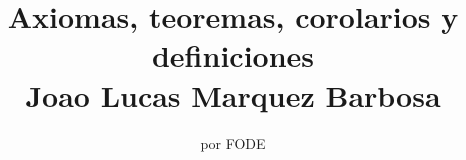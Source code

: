 \normalfont

\author{\Large  por FODE}
\title{Axiomas, teoremas, corolarios y definiciones\\ \small Joao Lucas Marquez Barbosa}
\date{}
\pagestyle{empty}
\maketitle
\thispagestyle{empty}
\let\cleardoublepage\clearpage
\tableofcontents								%


 
\let\cleardoublepage\clearpage
